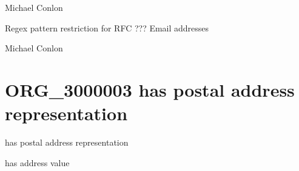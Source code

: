 \documentclass[letterpaper,10pt,english]{sphinxmanual}
\begin{document}
\begin{sphinxShadowBox}

\sphinxAtStartPar
Michael Conlon 
\end{sphinxShadowBox}

\begin{sphinxShadowBox}

\sphinxAtStartPar
{}
\end{sphinxShadowBox}

\begin{sphinxShadowBox}

\sphinxAtStartPar
Regex pattern restriction for RFC ??? Email addresses
\end{sphinxShadowBox}

\begin{sphinxShadowBox}

\sphinxAtStartPar
Michael Conlon 
\end{sphinxShadowBox}
\begin{quote}
\label{\detokenize{doc-ORG_3000003:org-3000003}}\label{\detokenize{doc-ORG_3000003:has-postal-address-representation}}\label{\detokenize{doc-ORG_3000003:org-3000003}}
\ignorespaces \end{quote}


\section{ORG\_3000003 \sphinxhyphen{} has postal address representation}
\label{\detokenize{doc-ORG_3000003:org-3000003-has-postal-address-representation}}\label{\detokenize{doc-ORG_3000003:index-0}}\label{\detokenize{doc-ORG_3000003::doc}}
\begin{sphinxShadowBox}

\sphinxAtStartPar
has postal address representation
\end{sphinxShadowBox}

\begin{sphinxShadowBox}

\sphinxAtStartPar
has address value
\end{sphinxShadowBox}
\end{document}
